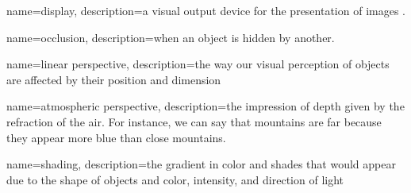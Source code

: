 {
  name=display,
  description={a visual output device for the presentation of images \cite{pimenta2012comprehensive}. }
}

{
	name=occlusion,
	description={when an object is hidden by another.}
}

{
	name={linear perspective},
	description={the way our visual perception of objects are affected by their position and dimension}
}

{
	name={atmospheric perspective},
	description={the impression of depth given by the refraction of the air. For instance, we can say that mountains are far because they appear more blue than close mountains.}
}	

{
	name=shading,
	description={the gradient in color and shades that would appear due to the shape of objects and color, intensity, and direction of light}
}